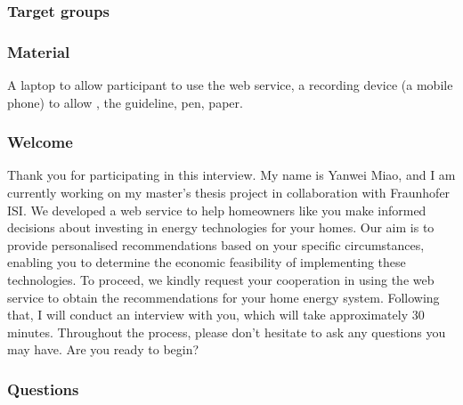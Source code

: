 \subsubsection{Target groups}



\subsubsection{Material}

A laptop to allow participant to use the web service, 
a recording device (a mobile phone) to allow , the guideline, pen, paper.


\subsubsection{Welcome}

Thank you for participating in this interview. 
My name is Yanwei Miao, and I am currently working on my master's thesis project in collaboration with Fraunhofer ISI.
We developed a web service to help homeowners like you make informed decisions about investing in energy technologies for your homes. 
Our aim is to provide personalised recommendations based on your specific circumstances, enabling you to determine the economic feasibility of implementing these technologies. 
To proceed, we kindly request your cooperation in using the web service to obtain the recommendations for your home energy system. 
Following that, I will conduct an interview with you, which will take approximately 30 minutes. 
Throughout the process, please don't hesitate to ask any questions you may have. 
Are you ready to begin?


\subsubsection{Questions}

